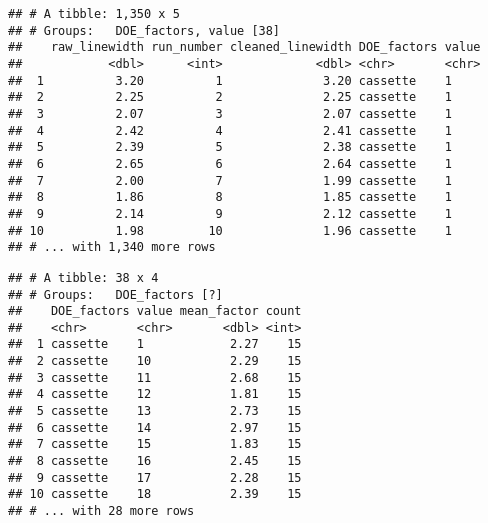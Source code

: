 \documentclass[]{book}
\newenvironment{Shaded}{\begin{snugshade}}{\end{snugshade}}
\newcommand{\DataTypeTok}[1]{\textcolor[rgb]{0.13,0.29,0.53}{#1}}
\newcommand{\KeywordTok}[1]{\textcolor[rgb]{0.13,0.29,0.53}{\textbf{#1}}}
\newcommand{\NormalTok}[1]{#1}
\newcommand{\OperatorTok}[1]{\textcolor[rgb]{0.81,0.36,0.00}{\textbf{#1}}}
\newcommand{\StringTok}[1]{\textcolor[rgb]{0.31,0.60,0.02}{#1}}
\theoremstyle{definition}
\theoremstyle{definition}
\theoremstyle{definition}
\theoremstyle{remark}
\begin{document}
\begin{Shaded}
\end{Shaded}

\begin{verbatim}
## # A tibble: 1,350 x 5
## # Groups:   DOE_factors, value [38]
##    raw_linewidth run_number cleaned_linewidth DOE_factors value
##            <dbl>      <int>             <dbl> <chr>       <chr>
##  1          3.20          1              3.20 cassette    1    
##  2          2.25          2              2.25 cassette    1    
##  3          2.07          3              2.07 cassette    1    
##  4          2.42          4              2.41 cassette    1    
##  5          2.39          5              2.38 cassette    1    
##  6          2.65          6              2.64 cassette    1    
##  7          2.00          7              1.99 cassette    1    
##  8          1.86          8              1.85 cassette    1    
##  9          2.14          9              2.12 cassette    1    
## 10          1.98         10              1.96 cassette    1    
## # ... with 1,340 more rows
\end{verbatim}

\begin{Shaded}
\end{Shaded}

\begin{verbatim}
## # A tibble: 38 x 4
## # Groups:   DOE_factors [?]
##    DOE_factors value mean_factor count
##    <chr>       <chr>       <dbl> <int>
##  1 cassette    1            2.27    15
##  2 cassette    10           2.29    15
##  3 cassette    11           2.68    15
##  4 cassette    12           1.81    15
##  5 cassette    13           2.73    15
##  6 cassette    14           2.97    15
##  7 cassette    15           1.83    15
##  8 cassette    16           2.45    15
##  9 cassette    17           2.28    15
## 10 cassette    18           2.39    15
## # ... with 28 more rows
\end{verbatim}
\end{document}

